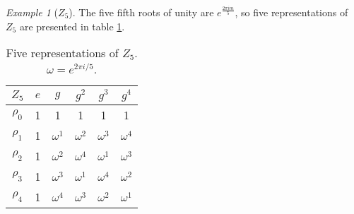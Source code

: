 \documentclass[12pt, a4paper, twoside]{article}
\newcommand{\SO}{\text{SO}}
\newcommand{\SU}{\text{SU}}
\newcommand{\1}{\mathbf{1}}
\theoremstyle{definition}
\theoremstyle{plain}
\theoremstyle{remark}
\newtheorem{example}[definition]{Example}
\begin{document}
\begin{example}[$Z_5$]
	The five fifth roots of unity are $e^{\frac{2\pi im}{5}}$, so five representations of $Z_5$ are presented in table \ref{table:Z5}.
	
	\begin{table}[hbt!]
		\centering
		\caption{Five representations of $Z_5$. $\omega = e^{2 \pi i/5}$.}
		\begin{tabular}{c | c c c c c}
			\label{table:Z5}
								$Z_5$ & $e$ & $g$        & $g^2$      & $g^3$      & $g^4$      \\ \hline
			           $\rho_0$            & 1   & 1          & 1          & 1          & 1          \\
			           $\rho_1$            & 1   & $\omega^1$ & $\omega^2$ & $\omega^3$ & $\omega^4$ \\
			           $\rho_2$            & 1   & $\omega^2$ & $\omega^4$ & $\omega^1$ & $\omega^3$ \\
			           $\rho_3$            & 1   & $\omega^3$ & $\omega^1$ & $\omega^4$ & $\omega^2$ \\
			           $\rho_4$            & 1   & $\omega^4$ & $\omega^3$ & $\omega^2$ & $\omega^1$
		\end{tabular}
	\end{table}
\end{example}
	

%
%
\clearpage{\thispagestyle{empty}}
%
%
%
 
%
\end{document}
